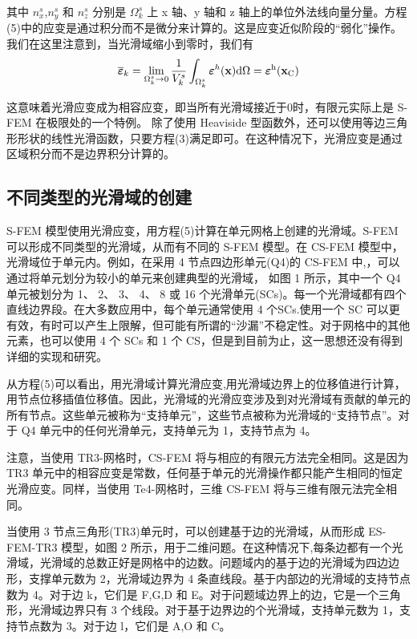 \documentclass[12pt,a4paper]{article}
\begin{document}
其中 $n^s_x$,$n^s_y$ 和 $n^s_z$ 分别是 $\Omega ^s_k$ 上 x 轴、y 轴和 z 轴上的单位外法线向量分量。方程(5)中的应变是通过积分而不是微分来计算的。这是应变近似阶段的“弱化”操作。
我们在这里注意到，当光滑域缩小到零时，我们有
\begin{equation}
\overline{\boldsymbol{\varepsilon}}_k =
\lim_{{\Omega ^s_k}\to 0}\frac{1}{V^s_k}\int_{\Omega ^s_k}^{} \boldsymbol{\varepsilon}^h (\rm\textbf{x}) d \Omega =
\boldsymbol{\varepsilon}^h (\rm\textbf{x}_C)
\end{equation}

这意味着光滑应变成为相容应变，即当所有光滑域接近于0时，有限元实际上是 S-FEM 在极限处的一个特例。
除了使用 Heaviside 型函数外，还可以使用等边三角形形状的线性光滑函数，只要方程(3)满足即可。在这种情况下，光滑应变是通过区域积分而不是边界积分计算的。

\subsection{不同类型的光滑域的创建}
S-FEM 模型使用光滑应变，用方程(5)计算在单元网格上创建的光滑域。S-FEM 可以形成不同类型的光滑域，从而有不同的 S-FEM 模型。在 CS-FEM 模型中，光滑域位于单元内。例如，在采用 4 节点四边形单元(Q4)的 CS-FEM 中,，可以通过将单元划分为较小的单元来创建典型的光滑域，
如图 1 所示，其中一个 Q4 单元被划分为 1、 2、 3、 4、 8 或 16 个光滑单元(SCs)。每一个光滑域都有四个直线边界段。在大多数应用中，每个单元通常使用 4 个SCs.使用一个 SC 可以更有效，有时可以产生上限解，但可能有所谓的“沙漏”不稳定性。对于网格中的其他元素，也可以使用 4 个 SCs 和 1 个 CS，但是到目前为止，这一思想还没有得到详细的实现和研究。

从方程(5)可以看出，用光滑域计算光滑应变,用光滑域边界上的位移值进行计算，用节点位移插值位移值。因此，光滑域的光滑应变涉及到对光滑域有贡献的单元的所有节点。这些单元被称为“支持单元”，这些节点被称为光滑域的“支持节点”。对于 Q4 单元中的任何光滑单元，支持单元为 1，支持节点为 4。

注意，当使用 TR3-网格时，CS-FEM 将与相应的有限元方法完全相同。这是因为 TR3 单元中的相容应变是常数，任何基于单元的光滑操作都只能产生相同的恒定光滑应变。同样，当使用 Te4-网格时，三维 CS-FEM 将与三维有限元法完全相同。

当使用 3 节点三角形(TR3)单元时，可以创建基于边的光滑域，从而形成 ES-FEM-TR3 模型，如图 2 所示，用于二维问题。在这种情况下,每条边都有一个光滑域，光滑域的总数正好是网格中的边数。问题域内的基于边的光滑域为四边边形，支撑单元数为 2，光滑域边界为 4 条直线段。基于内部边的光滑域的支持节点数为 4。对于边 k，它们是 F,G,D 和 E。对于问题域边界上的边，它是一个三角形，光滑域边界只有 3 个线段。对于基于边界边的个光滑域，支持单元数为 1，支持节点数为 3。对于边 l，它们是 A,O 和 C。
\end{document}
